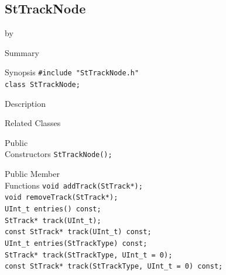 \documentclass[twoside]{article}
\newcommand{\entrylabel}[1]{\mbox{\textbf{{#1}}}\hfil}%
\newenvironment{entry}
{\begin{list}{}%
    {\renewcommand{\makelabel}{\entrylabel}%
     \setlength{\labelwidth}{90pt}%
     \setlength{\leftmargin}{\labelwidth}
     \advance\leftmargin by \labelsep%
      }%
    }%
  {\end{list}}
\newcommand{\Entrylabel}[1]%
{\raisebox{0pt}[1ex][0pt]{\makebox[\labelwidth][l]%
    {\parbox[t]{\labelwidth}{\hspace{0pt}\textbf{{#1}}}}}}
\newenvironment{Entry}%
{\renewcommand{\entrylabel}{\Entrylabel}\begin{entry}}%
  {\end{entry}}
\begin{document}
\subsection{StTrackNode}
\label{sec:StTrackNode}
\begin{Entry}
\item[Summary]
\item[Synopsis]
    \verb+#include "StTrackNode.h"+\\
    \verb+class StTrackNode;+\\
\item[Description]
\item[Related Classes]
\item[Public\\ Constructors]
    \verb+StTrackNode();+\\
\item[Public Member\\ Functions]
    \verb+void addTrack(StTrack*);+\\
    \verb+void removeTrack(StTrack*);+\\
    \verb+UInt_t entries() const;+\\
    \verb+StTrack* track(UInt_t);+\\
    \verb+const StTrack* track(UInt_t) const;+\\
    \verb+UInt_t entries(StTrackType) const;+\\
    \verb+StTrack* track(StTrackType, UInt_t = 0);+\\
    \verb+const StTrack* track(StTrackType, UInt_t = 0) const;+\\
\end{Entry}
\clearpage
\end{document}
